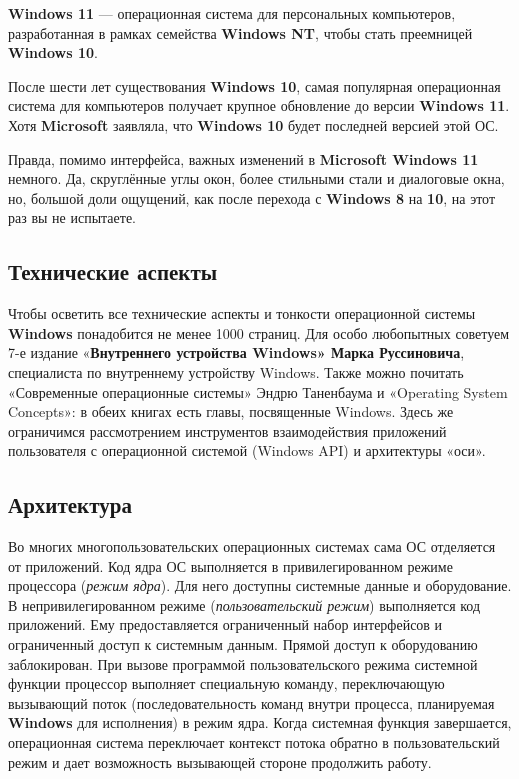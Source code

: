 \documentclass[14pt, a4paper]{article}
\begin{document}
\textbf{Windows 11} — операционная система для персональных компьютеров, разработанная в рамках семейства
\textbf{Windows NT}, чтобы стать преемницей \textbf{Windows 10}.

После шести лет существования \textbf{Windows 10}, самая популярная операционная система для компьютеров
получает крупное обновление до версии \textbf{Windows 11}. Хотя \textbf{Microsoft} заявляла,
что \textbf{Windows 10} будет последней версией этой ОС.


Правда, помимо интерфейса, важных изменений в \textbf{Microsoft Windows 11} немного. Да,
скруглённые углы окон, более стильными стали и диалоговые окна, но, большой доли ощущений,
как после перехода с \textbf{Windows 8} на \textbf{10}, на этот раз вы не испытаете. \newpage




\begin{center}
    \section*{Технические аспекты}
\end{center}

Чтобы осветить все технические аспекты и тонкости операционной системы \textbf{Windows} понадобится не менее
1000 страниц. Для особо любопытных советуем 7-е издание «\textbf{Внутреннего устройства Windows» Марка Руссиновича},
специалиста по внутреннему устройству Windows. Также можно почитать «Современные операционные системы»
Эндрю Таненбаума и «Operating System Concepts»: в обеих книгах есть главы, посвященные Windows.
Здесь же ограничимся рассмотрением инструментов взаимодействия приложений пользователя с операционной
системой (Windows API) и архитектуры «оси». \\


\begin{centering}
    \subsection*{Архитектура}
\end{centering}

Во многих многопользовательских операционных системах сама ОС отделяется от приложений.
Код ядра ОС выполняется в привилегированном режиме процессора (\textit{режим ядра}).
Для него доступны системные данные и оборудование. В непривилегированном режиме
(\textit{пользовательский режим}) выполняется код приложений. Ему предоставляется ограниченный набор
интерфейсов и ограниченный доступ к системным данным. Прямой доступ к оборудованию заблокирован.
При вызове программой пользовательского режима системной функции процессор выполняет специальную команду,
переключающую вызывающий поток (последовательность команд внутри процесса, планируемая \textbf{Windows} для исполнения)
в режим ядра. Когда системная функция завершается, операционная система переключает контекст
потока обратно в пользовательский режим и дает возможность вызывающей стороне продолжить работу.
\end{document}
